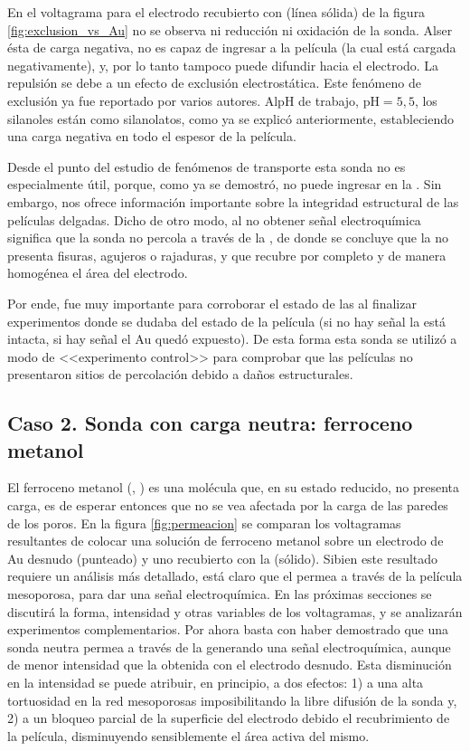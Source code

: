 	 En el voltagrama para el electrodo recubierto con \pdmF\space (línea sólida) de la figura \ref{fig:exclusion_vs_Au} no se observa ni reducción ni oxidación de la sonda. Al\space ser ésta de carga negativa, no es capaz de ingresar a la película (la cual está cargada negativamente), y, por lo tanto tampoco puede difundir hacia el electrodo. La repulsión se debe a un efecto de exclusión electrostática. Este fenómeno de exclusión ya fue reportado por varios autores\cite{alberti2015,schmuhl2005,Andrieu-Brunsen2015,brunsen2011}. Al\space pH de trabajo, $\text{pH}=5,5$, los silanoles están como silanolatos, como ya se explicó anteriormente, estableciendo una carga negativa en todo el espesor de la película.
  
	 Desde el punto del estudio de fenómenos de  transporte esta sonda no es especialmente útil, porque, como ya se demostró, no puede ingresar en la \pdm. Sin embargo, nos ofrece información importante sobre la integridad estructural de las películas delgadas. Dicho de otro modo, al no obtener señal electroquímica significa que la sonda no percola a través de la \pdm, de donde se concluye que la \pdm\space no presenta fisuras, agujeros o rajaduras, y que recubre por completo y de manera homogénea el área del electrodo. 

	 Por ende, fue muy importante para corroborar el estado de las \pdm\space al finalizar experimentos donde se dudaba del estado de la película (si no hay señal la \pdm\space está intacta, si hay señal el Au quedó expuesto). De esta forma esta sonda se utilizó a modo de <<experimento control>> para comprobar que las películas no presentaron sitios de percolación debido a daños estructurales.

	\subsection{Caso 2. Sonda con carga neutra: ferroceno metanol}

		El ferroceno metanol (\ferroceno, \fc) es una molécula que, en su estado reducido, no presenta carga, es de esperar entonces que no se vea afectada por la carga de las paredes de los poros. En la figura \ref{fig:permeacion} se comparan los voltagramas resultantes de colocar una solución de ferroceno metanol sobre un electrodo de Au desnudo (punteado) y uno recubierto con la \pdm\space (sólido). Si\space bien este resultado  requiere un análisis más detallado, está claro que el \fc\space permea a través de la película mesoporosa, para dar una señal electroquímica. En las próximas secciones se discutirá la forma, intensidad y otras variables de los voltagramas, y se analizarán experimentos complementarios. Por ahora basta con haber demostrado que una sonda neutra permea a través de la \pdm\space generando una señal electroquímica, aunque de menor intensidad que la obtenida con el electrodo desnudo. Esta disminución en la intensidad se puede atribuir, en principio, a dos efectos: 1) a una alta tortuosidad en la red mesoporosas imposibilitando la libre difusión de la sonda y\cite{Etienne2007}, 2) a un bloqueo parcial de la superficie del electrodo debido el recubrimiento de la película, disminuyendo sensiblemente el área activa del mismo\cite{Otal2006}.

